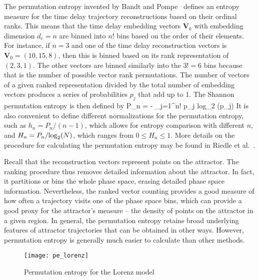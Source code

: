 The permutation entropy invented by Bandt and Pompe~\cite{bandt2002} defines an entropy measure for the time delay trajectory reconstructions based on their ordinal ranks. This means that
the time delay embedding vectors ${\mathbf{V}}_k$ with embedding dimension $d_e = n$ are binned into $n!$ bins based on the order of their elements. For instance, if $n=3$ and one of the 
time delay reconstruction vectors is ${\mathbf{V}}_0 = (10,15,8)$, then this is binned based on its rank representation  of $(2,3,1)$. 
The other vectors are binned similarly into the $3!=6$ bins because that is the number of possible vector rank permutations. 
The number of vectors of a given ranked representation divided by the total number of embedding vectors produces a series of probabilities $p_j$ that add up to 1. The Shannon permutation entropy
is then defined by
\beq
\label{perm_ent}
P_n = - \sum_{j=1}^{n!} p_j {\rm{log}}_2 (p_j)
\eeq
It is also convenient to define different normalizations for the permutation entropy, such as $h_n = P_n/(n-1)$, which allows for entropy comparison with different $n$, and
$H_n = P_n/{\rm{log}}_2 (N)$, which ranges from $0 \le H_n \le 1$. More details on the procedure for calculating the permutation entropy may be found in Riedle et al.~\cite{riedle2013}.

Recall that the reconstruction vectors represent points on the attractor. The ranking procedure thus removes detailed information about the attractor.
In fact, it partitions or bins the whole phase space, erasing detailed phase space information. Nevertheless, the ranked vector counting provides a good measure of how
often a trajectory visits one of the phase space bins, which can provide a good proxy for the attractor's measure -- the density of points on the attractor in a given region. 
In general, the permutation entropy retains broad underlying features of attractor trajectories that can be obtained in other ways. However, permutation entropy is generally much easier to calculate
than other methods.

\begin{figure}
\centerline{\texttt{[image: pe\_lorenz]}}
\caption{Permutation entropy for the Lorenz model}
\label{pe_lorenz}
\end{figure}

